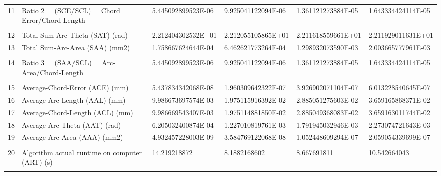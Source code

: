 \begin{landscape}
\begin{table}[ht]
{\begin{tabular}{ p{0.2cm} p{8.80cm} p{4.00cm} p{4.0cm} p{4.00cm} p{4.0cm}}
	11	&	Ratio 2 = (SCE/SCL) = Chord Error/Chord-Length	&	5.445092899523E-06	&	9.925041122094E-06	&	1.361121273884E-05	&	1.643334424114E-05	\\
	&		&		&		&		&		\\
	12	&	Total Sum-Arc-Theta (SAT) (rad)	&	2.212404302532E+01	&	2.212055105865E+01	&	2.211618559661E+01	&	2.211929011631E+01	\\
	13	&	Total Sum-Arc-Area (SAA) (mm2)	&	1.758667624644E-04	&	6.462621773264E-04	&	1.298932073590E-03	&	2.003665777961E-03	\\
	&		&		&		&		&		\\
	14	&	Ratio 3 = (SAA/SCL) = Arc-Area/Chord-Length	&	5.445092899523E-06	&	9.925041122094E-06	&	1.361121273884E-05	&	1.643334424114E-05	\\
	&		&		&		&		&		\\
	15	&	Average-Chord-Error (ACE) (mm)	&	5.437834342068E-08	&	1.960309642322E-07	&	3.926902071104E-07	&	6.013228540645E-07	\\
	16	&	Average-Arc-Length (AAL) (mm)	&	9.986673697574E-03	&	1.975115916392E-02	&	2.885051275603E-02	&	3.659165868371E-02	\\
	17	&	Average-Chord-Length (ACL) (mm)	&	9.986669543407E-03	&	1.975114881850E-02	&	2.885049368083E-02	&	3.659163011744E-02	\\
	18	&	Average-Arc-Theta (AAT) (rad)	&	6.205032400874E-04	&	1.227010819761E-03	&	1.791945032946E-03	&	2.273074721643E-03	\\
	19	&	Average-Arc-Area (AAA) (mm2)	&	4.932457228003E-09	&	3.584769122068E-08	&	1.052448609294E-07	&	2.059054339699E-07	\\
	&		&		&		&		&		\\
	20	&	Algorithm actual runtime on computer (ART) (s) 	&	14.219218872	&	8.1882168602	&	8.667691811	&	10.542664043	\\
	&		&		&		&		&	\\	
\hline	
\end{tabular}

}   %
		
\end{table}
\end{landscape}

\clearpage
\pagebreak
